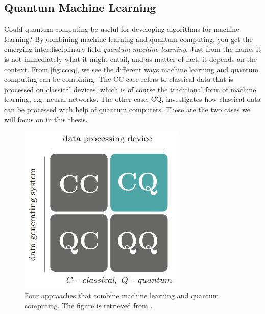 \subsection{Quantum Machine Learning}\label{sec:Quantum Machine Learning}
Could quantum computing be useful for developing algorithms for machine learning? By combining machine learning and quantum computing, you get the emerging interdisciplinary field \emph{quantum machine learning}. Just from the name, it is not immediately what it might entail, and as matter of fact, it depends on the context. From \autoref{fig:cccq}, we see the different ways machine learning and quantum computing can be combining. The CC case refers to classical data that is processed on classical devices, which is of course the traditional form of machine learning, e.g. neural networks. The other case, CQ, investigates how classical data can be processed with help of quantum computers. These are the two cases we will focus on in this thesis.

\begin{figure}[htp]
    \centering
    \includegraphics[width=8cm]{latex/figures/cccq.PNG}
    \caption{Four approaches that combine machine learning and quantum computing. The figure is retrieved from \citet{SupervisedwquantumComputers}.}
    \label{fig:cccq}
\end{figure}

